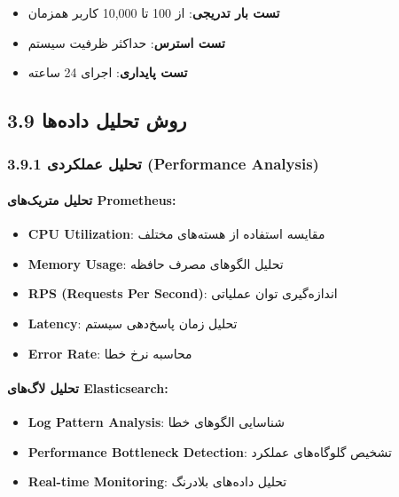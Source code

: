 \documentclass[
]{article}
\providecommand{\tightlist}{%
  \setlength{\itemsep}{0pt}\setlength{\parskip}{0pt}}
\begin{document}
\begin{itemize}
\tightlist
\item
  \textbf{تست بار تدریجی}: از 100 تا 10,000 کاربر همزمان
\item
  \textbf{تست استرس}: حداکثر ظرفیت سیستم
\item
  \textbf{تست پایداری}: اجرای 24 ساعته
\end{itemize}

\subsection{3.9 روش تحلیل
داده‌ها}\label{ux631ux648ux634-ux62aux62dux644ux6ccux644-ux62fux627ux62fux647ux647ux627}

\subsubsection{3.9.1 تحلیل عملکردی (Performance
Analysis)}\label{ux62aux62dux644ux6ccux644-ux639ux645ux644ux6a9ux631ux62fux6cc-performance-analysis}

\paragraph{تحلیل متریک‌های
Prometheus:}\label{ux62aux62dux644ux6ccux644-ux645ux62aux631ux6ccux6a9ux647ux627ux6cc-prometheus}

\begin{itemize}
\tightlist
\item
  \textbf{CPU Utilization}: مقایسه استفاده از هسته‌های مختلف
\item
  \textbf{Memory Usage}: تحلیل الگوهای مصرف حافظه
\item
  \textbf{RPS (Requests Per Second)}: اندازه‌گیری توان عملیاتی
\item
  \textbf{Latency}: تحلیل زمان پاسخ‌دهی سیستم
\item
  \textbf{Error Rate}: محاسبه نرخ خطا
\end{itemize}

\paragraph{تحلیل لاگ‌های
Elasticsearch:}\label{ux62aux62dux644ux6ccux644-ux644ux627ux6afux647ux627ux6cc-elasticsearch}

\begin{itemize}
\tightlist
\item
  \textbf{Log Pattern Analysis}: شناسایی الگوهای خطا
\item
  \textbf{Performance Bottleneck Detection}: تشخیص گلوگاه‌های عملکرد
\item
  \textbf{Real-time Monitoring}: تحلیل داده‌های بلادرنگ
\end{itemize}
\end{document}
